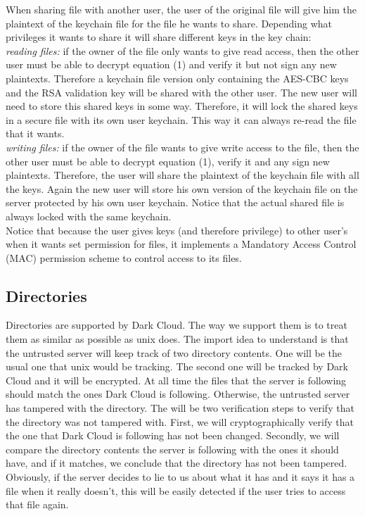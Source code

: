 \documentclass[a4paper]{article}
\begin{document}
When sharing file with another user, the user of the original file will give him the plaintext of the keychain file for the file he wants to share. Depending what privileges it wants to share it will share different keys in the key chain:\\

{\it reading files:} if the owner of the file only wants to give read access, then the other user must be able to decrypt equation (1) and verify it but not sign any new plaintexts. Therefore a keychain file version only containing the AES-CBC keys and the RSA validation key will be shared with the other user. The new user will need to store this shared keys in some way. Therefore, it will lock the shared keys in a secure file with its own user keychain. This way it can always re-read the file that it wants.\\

{\it writing files:} if the owner of the file wants to give write access to the file, then the other user must be able to decrypt equation (1), verify it and any sign new plaintexts. Therefore, the user will share the plaintext of the keychain file with all the keys. Again the new user will store his own version of the keychain file on the server protected by his own user keychain. Notice that the actual shared file is always locked with the same keychain. \\

Notice that because the user gives keys (and therefore privilege) to other user's when it wants set permission for files, it implements a Mandatory Access Control (MAC) permission scheme to control access to its files.

\subsection{Directories}

Directories are supported by Dark Cloud. The way we support them is to treat them as similar as possible as unix does. The import idea to understand is that the untrusted server will keep track of two directory contents. One will be the usual one that unix would be tracking. The second one will be tracked by Dark Cloud and it will be encrypted. At all time the files that the server is following should match the ones Dark Cloud is following. Otherwise, the untrusted server has tampered with the directory. The will be two verification steps to verify that the directory was not tampered with. First, we will cryptographically verify that the one that Dark Cloud is following has not been changed. Secondly, we will compare the directory contents the server is following with the ones it should have, and if it matches, we conclude that the directory has not been tampered. Obviously, if the server decides to lie to us about what it has and it says it has a file when it really doesn't, this will be easily detected if the user tries to access that file again.
\end{document}
